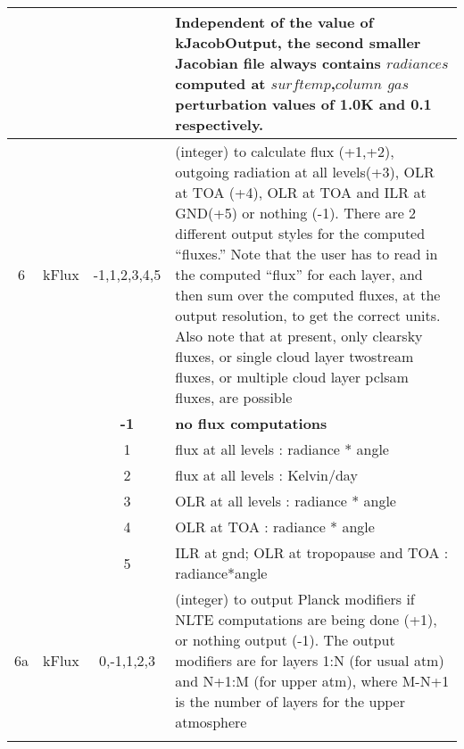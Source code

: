 \documentclass[12pt]{article}
\newlength{\colwidth}
\newlength{\colwidthshort}
\begin{document}
\begin{small}
\begin{longtable}{|c|c|c|p{\colwidthshort}|}
{   & & & Independent of the value of kJacobOutput, the second smaller Jacobian
         file always contains $radiances$ computed at $surftemp$,$column$ $gas$
         perturbation values of 1.0K and 0.1 respectively.\\
  \hline
6 & {\sf kFlux}   & -1,1,2,3,4,5 & (integer) to calculate flux (+1,+2), 
    outgoing radiation at all levels(+3), OLR at TOA (+4), OLR at TOA and
    ILR at GND(+5) or nothing (-1). There are 2 different output styles for 
    the computed ``fluxes.'' Note that the user has to read in the computed 
   ``flux'' for each layer, and then sum over the computed fluxes, at the 
    output resolution, to get the correct units. Also note that at present, 
    only clearsky fluxes, or single cloud layer twostream fluxes, or multiple 
    cloud layer pclsam fluxes, are possible\\
   &  & {\bf -1}  & {\bf no flux computations} \\
   &             & 1 & flux at all levels : radiance * angle\\
   &             & 2 & flux at all levels : Kelvin/day\\ 
   &             & 3 & OLR  at all levels : radiance * angle\\
   &             & 4 & OLR  at TOA : radiance * angle\\
   &             & 5 & ILR at gnd; OLR at tropopause and TOA : radiance*angle\\
\hline
6a & {\sf kFlux}   & 0,-1,1,2,3 & (integer) to output Planck modifiers if NLTE 
computations are being done (+1), or nothing output (-1). The output modifiers are
for layers 1:N (for usual atm) and N+1:M (for upper atm), where M-N+1 is the number of
layers for the upper atmosphere\\
   
}
\end{longtable}
\end{small}
\end{document}
